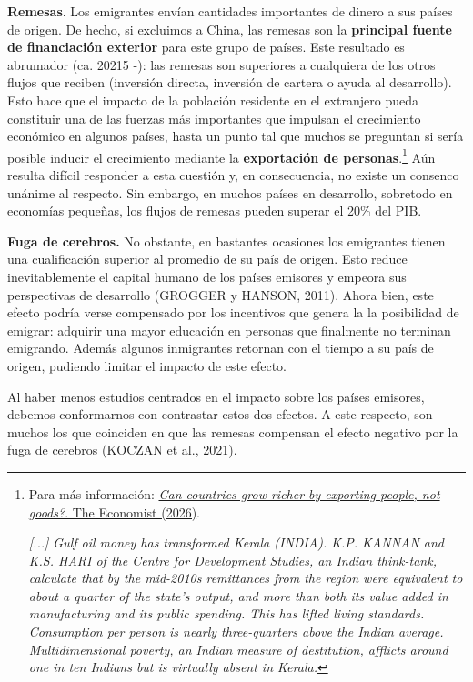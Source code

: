 \documentclass[10pt,a4paper]{article}
\begin{document}
\textbf{Remesas}. Los emigrantes envían cantidades importantes de dinero a sus países de origen. De hecho, si excluimos a China, las remesas son la \textbf{principal fuente de financiación exterior} para este grupo de países. Este resultado es abrumador (ca. 20215 -): las remesas son superiores a cualquiera de los otros flujos que reciben (inversión directa, inversión de cartera o ayuda al desarrollo). Esto hace que el impacto de la población residente en el extranjero pueda constituir una de las fuerzas más importantes que impulsan el crecimiento económico en algunos países, hasta un punto tal que muchos se preguntan si sería posible inducir el crecimiento mediante la \textbf{exportación de personas}.\footnote{%
    Para más información: \href{https://www.economist.com/finance-and-economics/2026/04/30/can-countries-grow-richer-by-exporting-people-not-goods}{\textit{Can countries grow richer by exporting people, not goods?}. The Economist (2026)}.

\textit{[...] Gulf oil money has transformed Kerala (INDIA). K.P. KANNAN and K.S. HARI of the Centre for Development Studies, an Indian think-tank, calculate that by the mid-2010s remittances from the region were equivalent to about a quarter of the state’s output, and more than both its value added in manufacturing and its public spending. This has lifted living standards. Consumption per person is nearly three-quarters above the Indian average. Multidimensional poverty, an Indian measure of destitution, afflicts around one in ten Indians but is virtually absent in Kerala.}
} Aún resulta difícil responder a esta cuestión y, en consecuencia, no existe un consenco unánime al respecto. Sin embargo, en muchos países en desarrollo, sobretodo en economías pequeñas, los flujos de remesas pueden superar el 20\% del PIB. 

\textbf{Fuga de cerebros.} No obstante, en bastantes ocasiones los emigrantes tienen una cualificación superior al promedio de su país de origen. Esto reduce inevitablemente el capital humano de los países emisores y empeora sus perspectivas de desarrollo (GROGGER y HANSON, 2011). Ahora bien, este efecto podría verse compensado por los incentivos que genera la la posibilidad de emigrar: adquirir una mayor educación en personas que finalmente no terminan emigrando. Además algunos inmigrantes retornan con el tiempo a su país de origen, pudiendo limitar el impacto de este efecto.

Al haber menos estudios centrados en el impacto sobre los países emisores, debemos conformarnos con contrastar estos dos efectos. A este respecto, son muchos los que coinciden en que las remesas compensan el efecto negativo por la fuga de cerebros (KOCZAN et al., 2021).
\end{document}
